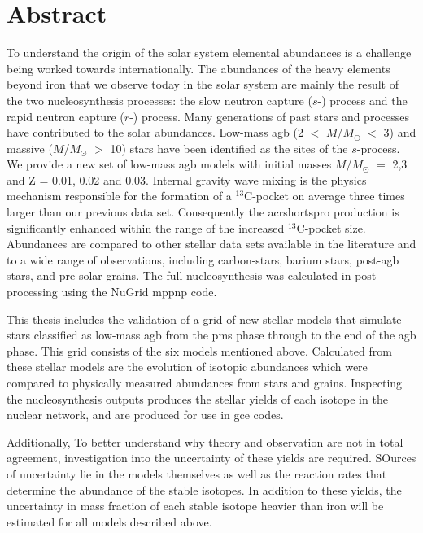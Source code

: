 \chapter{Abstract}

To understand the origin of the solar system elemental abundances is a challenge being worked towards internationally. The abundances of the heavy elements beyond iron that we observe today in the solar system are mainly the result of the two nucleosynthesis processes: the slow neutron capture ($s$-) process and the rapid neutron capture ($r$-) process. Many generations of past stars and processes have contributed to the solar abundances. Low-mass \acrfull{agb} (2 $<$ $M$/$M_\odot$ $<$ 3) and massive ($M$/$M_\odot$ $>$ 10) stars have been identified as the sites of the $s$-process. We provide a new set of low-mass \acrshort{agb} models with initial masses $M$/$M_\odot$ $=$ 2,3 and Z = 0.01, 0.02 and 0.03. Internal gravity wave mixing is the physics mechanism responsible for the formation of a $^{13}$C-pocket on average three times larger than our previous data set. Consequently the acrshort{spro} production is significantly enhanced within the range of the increased $^{13}$C-pocket size. Abundances are compared to other stellar data sets available in the literature and to a wide range of observations, including carbon-stars, barium stars, post-\acrshort{agb} stars, and pre-solar grains. The full nucleosynthesis was calculated in post-processing using the NuGrid mppnp code.

This thesis includes the validation of a grid of new stellar models that simulate stars classified as low-mass \acrshort{agb} from the \acrlong{pms} phase through to the end of the \acrshort{agb} phase. This grid consists of the six models mentioned above. Calculated from these stellar models are the evolution of isotopic abundances which were compared to physically measured abundances from stars and grains. Inspecting the nucleosynthesis outputs produces the stellar yields of each isotope in the nuclear network, and are produced for use in \acrfull{gce} codes. 

Additionally, To better understand why theory and observation are not in total agreement, investigation into the uncertainty of these yields are required. SOurces of uncertainty lie in the models themselves as well as the reaction rates that determine the abundance of the stable isotopes. In addition to these yields, the uncertainty in mass fraction of each stable isotope heavier than iron will be estimated for all models described above.  
